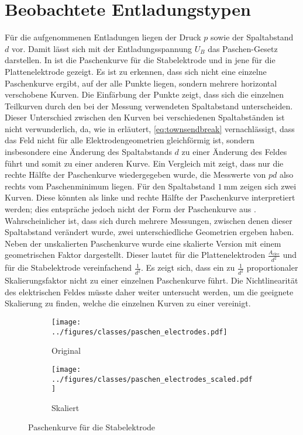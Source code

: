 \section{Beobachtete Entladungstypen}
Für die aufgenommenen Entladungen liegen der Druck \(p\) sowie der Spaltabstand \(d\) vor. Damit lässt sich mit der Entladungsspannung \(U_B\) das Paschen-Gesetz darstellen. In  ist die Paschenkurve für die Stabelektrode und in  jene für die Plattenelektrode gezeigt. Es ist zu erkennen, dass sich nicht eine einzelne Paschenkurve ergibt, auf der alle Punkte liegen, sondern mehrere horizontal verschobene Kurven. Die Einfärbung der Punkte zeigt, dass sich die einzelnen Teilkurven durch den bei der Messung verwendeten Spaltabstand unterscheiden. Dieser Unterschied zwischen den Kurven bei verschiedenen Spaltabständen ist nicht verwunderlich, da, wie in  erläutert, \eqref{eq:townsendbreak} vernachlässigt, dass das Feld nicht für alle Elektrodengeometrien gleichförmig ist, sondern insbesondere eine Änderung des Spaltabstands \(d\) zu einer Änderung des Feldes führt und somit zu einer anderen Kurve. Ein Vergleich mit  zeigt, dass nur die rechte Hälfte der Paschenkurve wiedergegeben wurde, die Messwerte von \(pd\) also rechts vom Paschenminimum liegen. Für den Spaltabstand \(\SI{1}{\milli\meter}\) zeigen sich zwei Kurven. Diese könnten als linke und rechte Hälfte der Paschenkurve interpretiert werden; dies entspräche jedoch nicht der Form der Paschenkurve aus . Wahrscheinlicher ist, dass sich durch mehrere Messungen, zwischen denen dieser Spaltabstand verändert wurde, zwei unterschiedliche Geometrien ergeben haben. Neben der unskalierten Paschenkurve wurde eine skalierte Version mit einem geometrischen Faktor dargestellt. Dieser lautet für die Plattenelektroden \(\frac{A_{\mathrm{elec}}}{d^2}\) und für die Stabelektrode vereinfachend \(\frac{1}{d^2}\). Es zeigt sich, dass ein zu \(\frac{1}{d^2}\) proportionaler Skalierungsfaktor nicht zu einer einzelnen Paschenkurve führt. Die Nichtlinearität des elektrischen Feldes müsste daher weiter untersucht werden, um die geeignete Skalierung zu finden, welche die einzelnen Kurven zu einer vereinigt.


\begin{figure}[H]
  \centering
  \begin{subfigure}{0.48\textwidth}
    \centering
    \texttt{[image: ../figures/classes/paschen\_electrodes.pdf]}
    \caption{Original}
  \end{subfigure}
  \hfill
  \begin{subfigure}{0.48\textwidth}
    \centering
    \texttt{[image: ../figures/classes/paschen\_electrodes\_scaled.pdf]}
    \caption{Skaliert}
  \end{subfigure}
  \caption{Paschenkurve für die Stabelektrode}
  \label{fig:paschencurvestab}
\end{figure}

